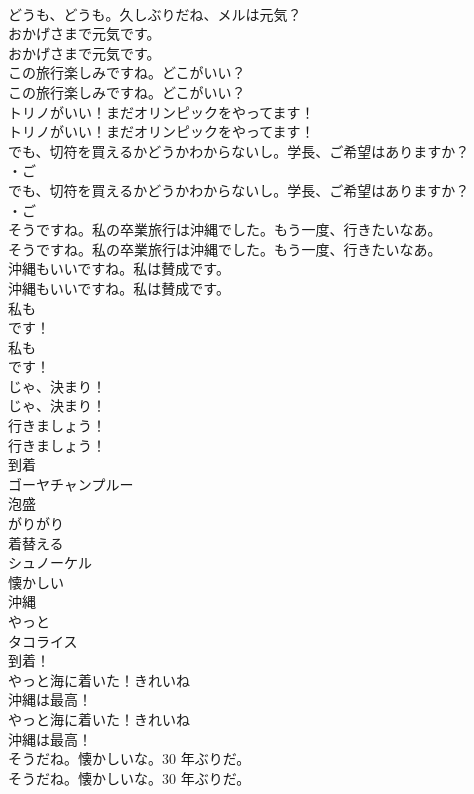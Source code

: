 \documentclass[8pt]{extreport}
\begin{document}
\begin{CJK}{UTF8}{min}
\\	どうも、どうも。久しぶりだね、メルは元気？ 
\\	おかげさまで元気です。	
\\	おかげさまで元気です。 
\\	この旅行楽しみですね。どこがいい？	
\\	この旅行楽しみですね。どこがいい？ 
\\	トリノがいい！まだオリンピックをやってます！	
\\	トリノがいい！まだオリンピックをやってます！ 
\\	でも、切符を買えるかどうかわからないし。学長、ご希望はありますか？	
\\	・ご 
\\	でも、切符を買えるかどうかわからないし。学長、ご希望はありますか？ 
\\	・ご 
\\	そうですね。私の卒業旅行は沖縄でした。もう一度、行きたいなあ。	
\\	そうですね。私の卒業旅行は沖縄でした。もう一度、行きたいなあ。 
\\	沖縄もいいですね。私は賛成です。	
\\	沖縄もいいですね。私は賛成です。 
\\	私も
\\	です！	
\\	私も
\\	です！ 
\\	じゃ、決まり！	
\\	じゃ、決まり！ 
\\	行きましょう！	
\\	行きましょう！ 
\\	到着
\\	ゴーヤチャンプルー
\\	泡盛
\\	がりがり
\\	着替える
\\	シュノーケル
\\	懐かしい
\\	沖縄
\\	やっと
\\	タコライス
\\	到着！	
\\	やっと海に着いた！きれいね
\\	沖縄は最高！	
\\	やっと海に着いた！きれいね
\\	沖縄は最高！ 
\\	そうだね。懐かしいな。30 年ぶりだ。	
\\	そうだね。懐かしいな。30 年ぶりだ。 

\end{CJK}
\end{document}
